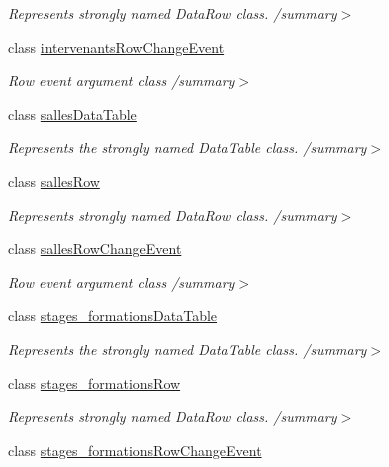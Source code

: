 \begin{DoxyCompactItemize}
\begin{DoxyCompactList}\small\item\em Represents strongly named Data\+Row class. /summary$>$ \end{DoxyCompactList}\item 
class \hyperlink{classforma_1_1formadb_data_set_1_1intervenants_row_change_event}{intervenants\+Row\+Change\+Event}
\begin{DoxyCompactList}\small\item\em Row event argument class /summary$>$ \end{DoxyCompactList}\item 
class \hyperlink{classforma_1_1formadb_data_set_1_1salles_data_table}{salles\+Data\+Table}
\begin{DoxyCompactList}\small\item\em Represents the strongly named Data\+Table class. /summary$>$ \end{DoxyCompactList}\item 
class \hyperlink{classforma_1_1formadb_data_set_1_1salles_row}{salles\+Row}
\begin{DoxyCompactList}\small\item\em Represents strongly named Data\+Row class. /summary$>$ \end{DoxyCompactList}\item 
class \hyperlink{classforma_1_1formadb_data_set_1_1salles_row_change_event}{salles\+Row\+Change\+Event}
\begin{DoxyCompactList}\small\item\em Row event argument class /summary$>$ \end{DoxyCompactList}\item 
class \hyperlink{classforma_1_1formadb_data_set_1_1stages__formations_data_table}{stages\+\_\+formations\+Data\+Table}
\begin{DoxyCompactList}\small\item\em Represents the strongly named Data\+Table class. /summary$>$ \end{DoxyCompactList}\item 
class \hyperlink{classforma_1_1formadb_data_set_1_1stages__formations_row}{stages\+\_\+formations\+Row}
\begin{DoxyCompactList}\small\item\em Represents strongly named Data\+Row class. /summary$>$ \end{DoxyCompactList}\item 
class \hyperlink{classforma_1_1formadb_data_set_1_1stages__formations_row_change_event}{stages\+\_\+formations\+Row\+Change\+Event}

\end{DoxyCompactItemize}
